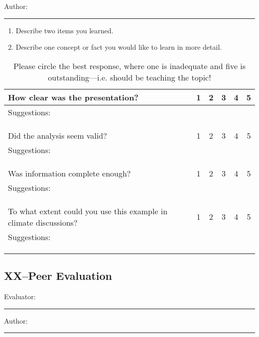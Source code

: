 \documentclass{article}\usepackage[]{graphicx}\usepackage[]{color}
\begin{document}
\noindent Author: \rule{7cm}{0.4pt}

\begin{enumerate}
 \setlength\itemsep{4em}
  \item Describe two items you learned.
  \item Describe one concept or fact you would like to learn in more detail.
\end{enumerate}


\begin{table}[ht!]
\caption{Please circle the best response, where one is inadequate and five is outstanding---i.e. should be teaching the topic!}
\begin{tabular}{|p{4in}|ccccc|}\hline
How clear was the presentation?     & 1 & 2 & 3 & 4 & 5 \\ \hline
Suggestions: &&&&& \\ &&&&& \\ &&&&& \\
&&&&& \\ \hline
Did the analysis seem valid?        & 1 & 2 & 3 & 4 & 5 \\ \hline
Suggestions: &&&&& \\ &&&&& \\ &&&&& \\
&&&&& \\ \hline
Was information complete enough?            & 1 & 2 & 3 & 4 & 5 \\ \hline
Suggestions: &&&&& \\ &&&&& \\ &&&&& \\
&&&&& \\ \hline
To what extent could you use this example in climate discussions?            & 1 & 2 & 3 & 4 & 5 \\ \hline
Suggestions: &&&&& \\ &&&&& \\ &&&&& \\
&&&&& \\ \hline
\end{tabular}
\end{table}

\clearpage
\newpage
\subsection{XX--Peer Evaluation}

\bigskip
Evaluator: \rule{7cm}{0.4pt}

\bigskip

\noindent Author: \rule{7cm}{0.4pt}
\end{document}
